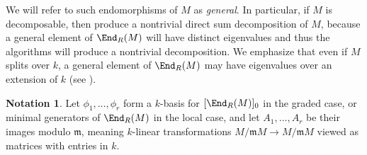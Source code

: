 \documentclass[12pt]{amsart}
\def\m{\mathfrak m}
\theoremstyle{theorem}
\numberwithin{thm}{section}
\theoremstyle{definition}
\newtheorem{nota}[thm]{Notation}
\begin{document}
We will refer to such endomorphisms of $M$ as \emph{general}. In particular, if $M$ is decomposable, then  produce a nontrivial direct sum decomposition of $M$, because a general element of $\End_R(M)$ will have distinct eigenvalues and thus the algorithms will produce a nontrivial decomposition. We emphasize that even if $M$ splits over $k$, a general element of $\End_R(M)$ may have eigenvalues over an extension of $k$ (see ).

\begin{nota}\label{notation:gensEnd0}
  Let $\phi_1,\dots,\phi_r$ form a $k$-basis for $[\End_R(M)]_0$ in the graded case, or minimal generators of $\End_R(M)$ in the local case, and let $A_1,\dots,A_r$ be their images modulo $\m$, meaning $k$-linear transformations $M/\m M\to M/\m M$ viewed as matrices with entries in $k$.
\end{nota}
\end{document}
